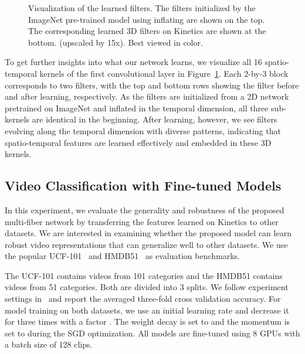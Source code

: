 \documentclass[runningheads]{llncs}
\newcommand{\ourslong}[0]{multi-fiber\xspace}
\begin{document}
\begin{figure}[t]	
	\center
    \vspace{-0.2cm}
	\caption{Visualization of the learned filters. The filters initialized by the ImageNet pre-trained model using inflating are shown on the top. The corresponding learned 3D filters on Kinetics are shown at the bottom. (upscaled by 15x). Best viewed in color.
    }
	\label{fig_learnt_kernels}
    \vspace{-0.1cm}
\end{figure}


To get further insights into what our network learns, we visualize all 16 spatio-temporal kernels of the first convolutional layer in Figure~\ref{fig_learnt_kernels}. Each 2-by-3 block corresponds to two  filters, with the top and bottom rows showing the filter before and after learning, respectively. As the filters are initialized from a 2D network pretrained on ImageNet and inflated in the temporal dimension, all three sub-kernels are identical in the beginning. After learning, however, we see filters evolving along the temporal dimension with diverse patterns, indicating that spatio-temporal features are learned effectively and embedded in these 3D kernels.



\subsection{Video Classification with Fine-tuned Models}

In this experiment, we evaluate the generality and robustness of the proposed \ourslong network by transferring the features learned on Kinetics to other datasets. We are interested in examining whether the proposed model can learn robust video representations  that can generalize well to other datasets. We use the popular UCF-101~\cite{soomro2012ucf101} and HMDB51~\cite{kuehne2011hmdb} as  evaluation benchmarks. 

The UCF-101 contains  videos from 101 categories and the HMDB51 contains  videos from 51 categories. Both are divided into 3 splits. We follow experiment settings in~\cite{tran2015learning,tran2017convnet,tran2017closer,xie2017rethinking} and report the averaged three-fold cross validation accuracy. For model training on both datasets, we use an initial learning rate  and decrease it for three times with a factor . The weight decay is set to  and the momentum is set to  during the SGD optimization. All models are fine-tuned using 8 GPUs with a batch size of 128 clips. 
\end{document}
